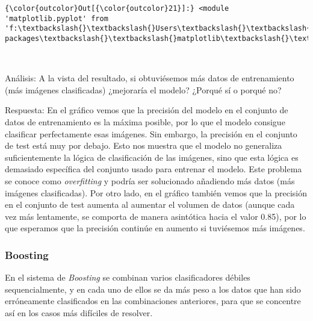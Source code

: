 \documentclass[11pt]{article}
\begin{document}
\begin{Verbatim}[commandchars=\\\{\}]
{\color{outcolor}Out[{\color{outcolor}21}]:} <module 'matplotlib.pyplot' from 'f:\textbackslash{}\textbackslash{}Users\textbackslash{}\textbackslash{}Ricardo\textbackslash{}\textbackslash{}Anaconda3\textbackslash{}\textbackslash{}envs\textbackslash{}\textbackslash{}my\_py35\textbackslash{}\textbackslash{}lib\textbackslash{}\textbackslash{}site-packages\textbackslash{}\textbackslash{}matplotlib\textbackslash{}\textbackslash{}pyplot.py'>
\end{Verbatim}
            
    \begin{center}
    \end{center}
    { \hspace*{\fill} \\}
    
    Análisis: A la vista del resultado, si obtuviésemos más datos de
entrenamiento (más imágenes clasificadas) ¿mejoraría el modelo? ¿Porqué
sí o porqué no?

    Respuesta: En el gráfico vemos que la precisión del modelo en el
conjunto de datos de entrenamiento es la máxima posible, por lo que el
modelo consigue clasificar perfectamente esas imágenes. Sin embargo, la
precisión en el conjunto de test está muy por debajo. Esto nos muestra
que el modelo no generaliza suficientemente la lógica de clasificación
de las imágenes, sino que esta lógica es demasiado específica del
conjunto usado para entrenar el modelo. Este problema se conoce como
\emph{overfitting} y podría ser solucionado añadiendo más datos (más
imágenes clasificadas). Por otro lado, en el gráfico también vemos que
la precisión en el conjunto de test aumenta al aumentar el volumen de
datos (aunque cada vez más lentamente, se comporta de manera asintótica
hacia el valor 0.85), por lo que esperamos que la precisión continúe en
aumento si tuviésemos más imágenes.

    \hypertarget{boosting}{%
\subsubsection{Boosting}\label{boosting}}

    En el sistema de \emph{Boosting} se combinan varios clasificadores
débiles sequencialmente, y en cada uno de ellos se da más peso a los
datos que han sido erróneamente clasificados en las combinaciones
anteriores, para que se concentre así en los casos más difíciles de
resolver.
\end{document}
